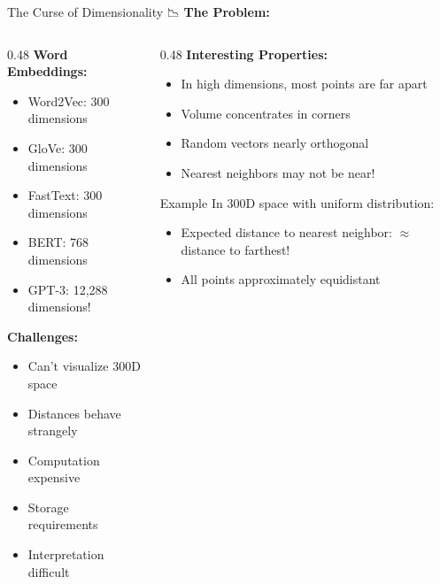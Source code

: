 \documentclass[aspectratio=169]{beamer}
\begin{document}
\begin{frame}[shrink=10]{The Curse of Dimensionality 📉}
\textbf{The Problem:}

\vspace{1em}

\begin{columns}[T]
\begin{column}{0.48\textwidth}
\textbf{Word Embeddings:}
\begin{itemize}\setlength{\itemsep}{0pt}
    \item Word2Vec: 300 dimensions
    \item GloVe: 300 dimensions
    \item FastText: 300 dimensions
    \item BERT: 768 dimensions
    \item GPT-3: 12,288 dimensions!
\end{itemize}

\vspace{0.5em}
\textbf{Challenges:}
\begin{itemize}\setlength{\itemsep}{0pt}
    \item Can't visualize 300D space
    \item Distances behave strangely
    \item Computation expensive
    \item Storage requirements
    \item Interpretation difficult
\end{itemize}
\end{column}

\begin{column}{0.48\textwidth}
\textbf{Interesting Properties:}
\begin{itemize}\setlength{\itemsep}{0pt}
    \item In high dimensions, most points are far apart
    \item Volume concentrates in corners
    \item Random vectors nearly orthogonal
    \item Nearest neighbors may not be near!
\end{itemize}

\vspace{1em}
\begin{exampleblock}{Example}
In 300D space with uniform distribution:
\begin{itemize}\setlength{\itemsep}{0pt}
    \item Expected distance to nearest neighbor: $\approx$ distance to farthest!
    \item All points approximately equidistant
\end{itemize}
\end{exampleblock}
\end{column}
\end{columns}


\end{frame}
\end{document}
